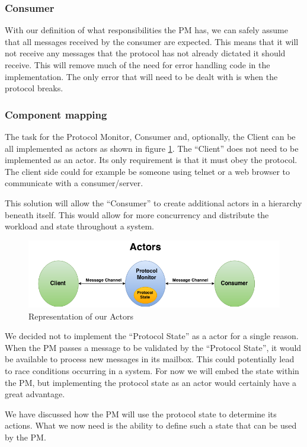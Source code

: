 \subsubsection{Consumer}
With our definition of what responsibilities the PM has, we can safely assume that all messages received by the consumer are expected. This means that it will not receive any messages that the protocol has not already dictated it should receive. This will remove much of the need for error handling code in the implementation. The only error that will need to be dealt with is when the protocol breaks.  


\subsubsection{Component mapping}
The task for the Protocol Monitor, Consumer and, optionally, the Client can be all implemented as actors as shown in figure \ref{fig:ArchitectureMapping}. The ``Client'' does not need to be implemented as an actor. Its only requirement is that it must obey the protocol. The client side could for example be someone using telnet or a web browser to communicate with a consumer/server.

This solution will allow the ``Consumer'' to create additional actors in a hierarchy beneath itself. This would allow for more concurrency and distribute the workload and state throughout a system.
\begin{figure}[h]
	\centering
	\includegraphics[scale=0.45]{images/architecture/ArchitectureMapping.png} 
	\caption{Representation of our Actors}
	\label{fig:ArchitectureMapping}
\end{figure}
We decided not to implement the ``Protocol State'' as a actor for a single reason. When the PM passes a message to be validated by the ``Protocol State'', it would be available to process new messages in its mailbox. This could potentially lead to race conditions occurring in a system. For now we will embed the state within the PM, but implementing the protocol state as an actor would certainly have a great advantage.

We have discussed how the PM will use the protocol state to determine its actions. What we now need is the ability to define such a state that can be used by the PM.

